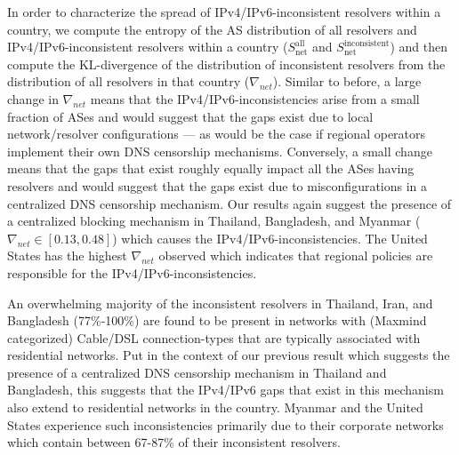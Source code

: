 %
In order to characterize the spread of IPv4/IPv6-inconsistent resolvers within
a country, we compute the entropy of the AS distribution of all resolvers and
IPv4/IPv6-inconsistent resolvers within a country
($S^{\text{all}}_{\text{net}}$ and $S^{\text{inconsistent}}_{\text{net}}$) and
then compute the KL-divergence of the distribution of inconsistent resolvers
from the distribution of all resolvers in that country ($\nabla_{net}$).
%
Similar to before, a large change in $\nabla_{net}$ means that the
IPv4/IPv6-inconsistencies arise from a small fraction of ASes and would suggest
that the gaps exist due to local network/resolver configurations --- as
would be the case if regional operators implement their own DNS censorship
mechanisms. Conversely, a small change means that the gaps that exist roughly
equally impact all the ASes having resolvers and would suggest that the gaps
exist due to misconfigurations in a centralized DNS censorship mechanism.
%
Our results again suggest the presence of a centralized blocking mechanism
in Thailand, Bangladesh, and Myanmar ($\nabla_{net} \in [0.13, 0.48]$) which
causes the IPv4/IPv6-inconsistencies. The United States has the highest
$\nabla_{net}$ observed which indicates that regional policies are responsible
for the IPv4/IPv6-inconsistencies. 

%
An overwhelming majority of the inconsistent resolvers in Thailand, Iran, and
Bangladesh (77\%-100\%) are found to be present in networks with (Maxmind
categorized) Cable/DSL connection-types that are typically associated with
residential networks. 
%
Put in the context of our previous result which suggests the presence of
a centralized DNS censorship mechanism in Thailand and Bangladesh, this
suggests that the IPv4/IPv6 gaps that exist in this mechanism also extend to
residential networks in the country.
%
Myanmar and the United States experience such inconsistencies primarily due to
their corporate networks which contain between 67-87\% of their inconsistent
resolvers. 

